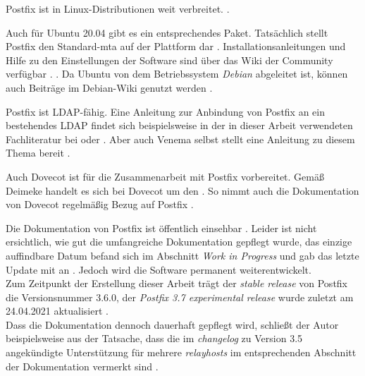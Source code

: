 Postfix ist in Linux-Distributionen weit verbreitet.  \citep[][53]{Heinlein2004}.

Auch für Ubuntu 20.04 gibt es ein entsprechendes Paket. Tatsächlich stellt Postfix den Standard-\ac{mta} auf der Plattform dar \citep[vgl.][]{ubuntupostfix}.
Installationsanleitungen und Hilfe zu den Einstellungen der Software sind über das Wiki der Community verfügbar \citep[vgl.][]{ubuntupostfixwiki}. 
 \citep[][]{ubuntupostfix}. Da Ubuntu von dem Betriebssystem \textit{Debian} abgeleitet ist, können auch Beiträge im Debian-Wiki genutzt werden \citep[vgl.][]{debianpostfix}. 

Postfix ist LDAP-fähig.
Eine Anleitung zur Anbindung von Postfix an ein bestehendes LDAP findet sich beispielsweise in der in dieser Arbeit verwendeten Fachliteratur bei \cite[S. 689 ff.]{Deimeke2019} oder \cite[S. 107 f.]{Heinlein2004}. Aber auch Venema selbst stellt eine Anleitung zu diesem Thema bereit \citep[vgl.][]{ubuntudovecotLDAPwiki}.

Auch Dovecot ist für die Zusammenarbeit mit Postfix vorbereitet. 
Gemäß Deimeke handelt es sich bei Dovecot um den  \citep[][338]{Deimeke2019}. 
So nimmt auch die Dokumentation von Dovecot regelmäßig Bezug auf Postfix \citep[vgl. z.B.][]{DovecotPostfix}.

Die Dokumentation von Postfix ist öffentlich einsehbar \citep[vgl.][]{postfixdoku}. Leider ist nicht ersichtlich, wie gut die umfangreiche Dokumentation gepflegt wurde, das einzige auffindbare Datum befand sich im Abschnitt \textit{Work in Progress} und gab das letzte Update mit  an \citep[vgl.][]{postfixwip}. Jedoch wird die Software permanent weiterentwickelt. \\
Zum Zeitpunkt der Erstellung dieser Arbeit trägt der \textit{stable release} von Postfix die Versionsnummer 3.6.0, der \textit{Postfix 3.7 experimental release} wurde zuletzt am 24.04.2021 aktualisiert \citep[vgl.][]{postfixsource}. \\
Dass die Dokumentation dennoch dauerhaft gepflegt wird, schließt der Autor beispielsweise aus der Tatsache, dass die im \textit{changelog} zu Version 3.5 angekündigte Unterstützung für mehrere \textit{relayhosts} \citep[vgl.][]{postfixcl35} im entsprechenden Abschnitt der Dokumentation vermerkt sind \citep[vgl.][]{postfixrelayhost}.

